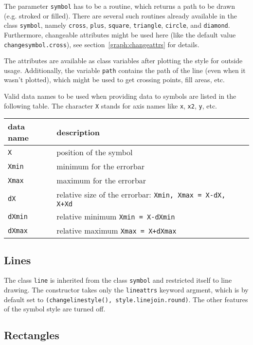 The parameter \verb|symbol| has to be a routine, which returns a path to
be drawn (e.g. stroked or filled). There are several such routines
already available in the class \verb|symbol|, namely \verb|cross|,
\verb|plus|, \verb|square|, \verb|triangle|, \verb|circle|, and
\verb|diamond|. Furthermore, changeable attributes might be used here
(like the default value \verb|changesymbol.cross|), see
section~\ref{graph:changeattrs} for details.

The attributes are available as class variables after plotting the
style for outside usage. Additionally, the variable \verb|path|
contains the path of the line (even when it wasn't plotted), which
might be used to get crossing points, fill areas, etc.

Valid data names to be used when providing data to symbols are listed
in the following table. The character \verb|X| stands for axis names
like \verb|x|, \verb|x2|, \verb|y|, etc.

\begin{center}
\begin{tabular}{ll}
data name&description\\
\hline
\texttt{X}&position of the symbol\\
\texttt{Xmin}&minimum for the errorbar\\
\texttt{Xmax}&maximum for the errorbar\\
\texttt{dX}&relative size of the errorbar: \texttt{Xmin, Xmax = X-dX, X+Xd}\\
\texttt{dXmin}&relative minimum \texttt{Xmin = X-dXmin}\\
\texttt{dXmax}&relative maximum \texttt{Xmax = X+dXmax}\\
\end{tabular}
\end{center}

\subsection{Lines}

The class \verb|line| is inherited from the class \verb|symbol| and
restricted itself to line drawing. The constructor takes only the
\verb|lineattrs| keyword argment, which is by default set to
\verb|(changelinestyle(), style.linejoin.round)|. The other features
of the symbol style are turned off.

\subsection{Rectangles}

